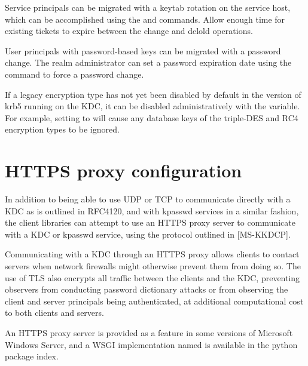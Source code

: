 \documentclass[letterpaper,10pt,english]{sphinxmanual}
\begin{document}
Service principals can be migrated with a keytab rotation on the
service host, which can be accomplished using the {\hyperref[\detokenize{admin/admin_commands/k5srvutil:k5srvutil-1}]{}}
 and  commands.  Allow enough time for existing
tickets to expire between the change and delold operations.

User principals with password-based keys can be migrated with a
password change.  The realm administrator can set a password
expiration date using the {\hyperref[\detokenize{admin/admin_commands/kadmin_local:kadmin-1}]{}}  command to force a password change.

If a legacy encryption type has not yet been disabled by default in
the version of krb5 running on the KDC, it can be disabled
administratively with the  variable.  For
example, setting  to  will
cause any database keys of the triple-DES and RC4 encryption types to
be ignored.


\chapter{HTTPS proxy configuration}
\label{\detokenize{admin/https:https-proxy-configuration}}\label{\detokenize{admin/https::doc}}\label{\detokenize{admin/https:https}}
In addition to being able to use UDP or TCP to communicate directly
with a KDC as is outlined in RFC4120, and with kpasswd services in a
similar fashion, the client libraries can attempt to use an HTTPS
proxy server to communicate with a KDC or kpasswd service, using the
protocol outlined in {[}MS-KKDCP{]}.

Communicating with a KDC through an HTTPS proxy allows clients to
contact servers when network firewalls might otherwise prevent them
from doing so.  The use of TLS also encrypts all traffic between the
clients and the KDC, preventing observers from conducting password
dictionary attacks or from observing the client and server principals
being authenticated, at additional computational cost to both clients
and servers.

An HTTPS proxy server is provided as a feature in some versions of
Microsoft Windows Server, and a WSGI implementation named 
is available in the python package index.
\end{document}
